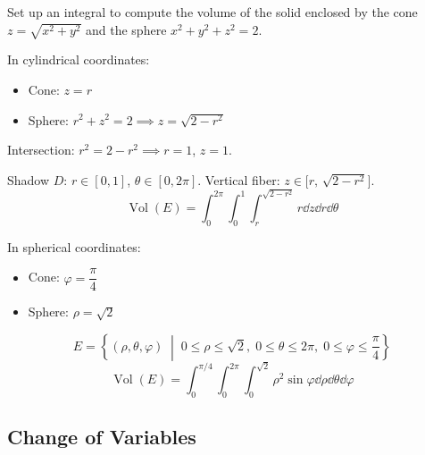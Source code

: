 \begin{example}
  Set up an integral to compute the volume of the solid enclosed by the cone $z = \sqrt{x^2+y^2}$ and the sphere $x^2+y^2+z^2 = 2$.

  \begin{center}
  \end{center}

  In cylindrical coordinates:
  \begin{itemize}
    \item Cone: $z = r$
    \item Sphere: $r^2 + z^2 = 2 \implies z = \sqrt{2 - r^2}$
  \end{itemize}
  Intersection: $r^2 = 2 - r^2 \implies r = 1$, $z = 1$.

  Shadow $D$: $r\in[0,1]$, $\theta\in[0,2\pi]$. \quad Vertical fiber: $z\in\bigl[r,\,\sqrt{2-r^2}\bigr]$.
  \[
    \operatorname{Vol}(E)
    = \int_0^{2\pi}\!\int_0^1\!\int_r^{\sqrt{2-r^2}} r\dd{z}\dd{r}\dd{\theta}
  \]

  In spherical coordinates:
  \begin{itemize}
    \item Cone: $\varphi = \dfrac{\pi}{4}$
    \item Sphere: $\rho = \sqrt{2}$
  \end{itemize}
  \[
    E = \left\{(\rho,\theta,\varphi) \;\middle|\; 0\leq\rho\leq\sqrt{2},\; 0\leq\theta\leq 2\pi,\; 0\leq\varphi\leq\frac{\pi}{4}\right\}
  \]
  \[
    \operatorname{Vol}(E)
    = \int_0^{\pi/4}\!\int_0^{2\pi}\!\int_0^{\sqrt{2}} \rho^2\sin\varphi\dd{\rho}\dd{\theta}\dd{\varphi}
  \]
\end{example}

\subsection{Change of Variables}

